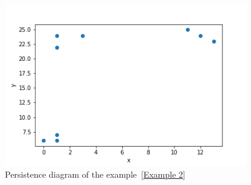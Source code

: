 \documentclass[english, LaM, oneside, noexaminfo]{sapthesis}
\begin{document}
\begin{figure}[tb]
\centering
\includegraphics[height=7cm]{dgm_Massimo_repr.png}
\caption{Persistence diagram of the example~\ref{Example 2}}\label{fig:dgm_Massimo}
\end{figure}
\end{document}
